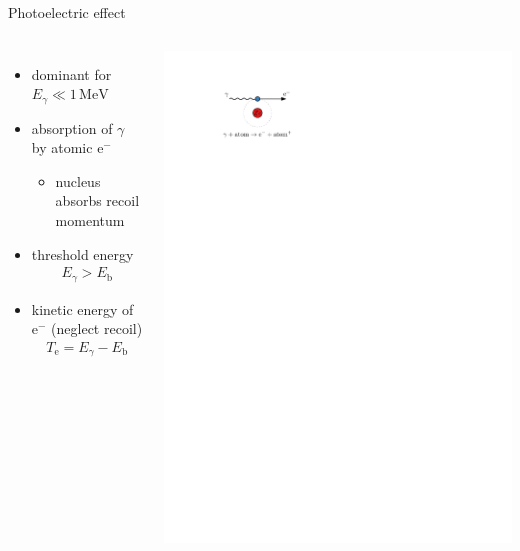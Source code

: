 \documentclass[11pt,xcolor=dvipsnames,professionalfonts]{beamer}
\begin{document}
\begin{frame}{Photoelectric effect}
	\begin{columns}
		\begin{itemize}
			\setlength\itemsep{1.5em}
			\item dominant for $E_\gamma \ll 1 \, \mathrm{MeV}$
			
			\item absorption of $\gamma$ by atomic $\mathrm{e}^-$
			\begin{itemize}
				\item nucleus absorbs recoil momentum
			\end{itemize}
			
			\item threshold energy
			\begin{align*}
				E_\gamma > E_\mathrm{b}
			\end{align*}

			\item kinetic energy of $\mathrm{e}^-$ (neglect recoil)
			\begin{align*}
				T_\mathrm{e} = E_\gamma - E_\mathrm{b}
			\end{align*}
		\end{itemize}
		
		\begin{center}
			\includegraphics{./figures/photoeffect_detail.pdf}
		\end{center}
	\end{columns}
\end{frame}
\end{document}
